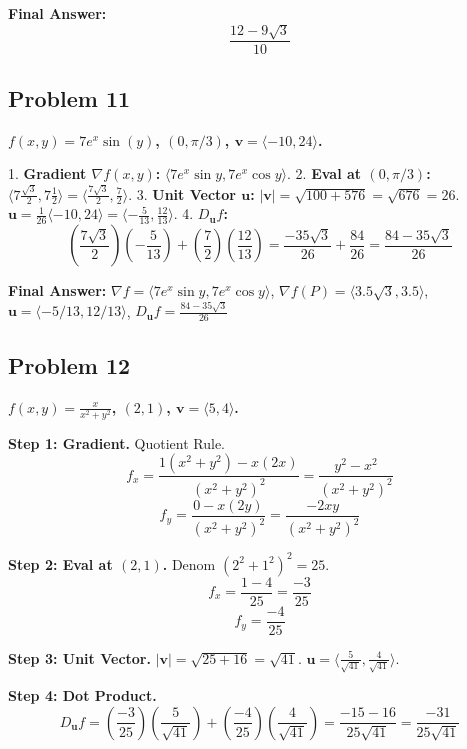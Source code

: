 \documentclass{article}
\begin{document}
\textbf{Final Answer:}
\[ \boxed{\frac{12 - 9\sqrt{3}}{10}} \]

\hrulefill

\subsection*{Problem 11}
\textbf{$f(x, y) = 7e^x \sin(y)$, $(0, \pi/3)$, $\mathbf{v} = \langle -10, 24 \rangle$.}

1. \textbf{Gradient $\nabla f(x,y)$:} $\langle 7e^x \sin y, 7e^x \cos y \rangle$.
2. \textbf{Eval at $(0, \pi/3)$:} $\langle 7\frac{\sqrt{3}}{2}, 7\frac{1}{2} \rangle = \langle \frac{7\sqrt{3}}{2}, \frac{7}{2} \rangle$.
3. \textbf{Unit Vector $\mathbf{u}$:} $|\mathbf{v}| = \sqrt{100 + 576} = \sqrt{676} = 26$.
   $\mathbf{u} = \frac{1}{26}\langle -10, 24 \rangle = \langle -\frac{5}{13}, \frac{12}{13} \rangle$.
4. \textbf{$D_{\mathbf{u}}f$:}
   \[ \left(\frac{7\sqrt{3}}{2}\right)\left(-\frac{5}{13}\right) + \left(\frac{7}{2}\right)\left(\frac{12}{13}\right) = \frac{-35\sqrt{3}}{26} + \frac{84}{26} = \frac{84 - 35\sqrt{3}}{26} \]

\textbf{Final Answer:}
$\nabla f = \langle 7e^x \sin y, 7e^x \cos y \rangle$, $\nabla f(P) = \langle 3.5\sqrt{3}, 3.5 \rangle$, $\mathbf{u} = \langle -5/13, 12/13 \rangle$, $D_{\mathbf{u}}f = \boxed{\frac{84 - 35\sqrt{3}}{26}}$

\hrulefill

\subsection*{Problem 12}
\textbf{$f(x, y) = \frac{x}{x^2+y^2}$, $(2, 1)$, $\mathbf{v} = \langle 5, 4 \rangle$.}

\textbf{Step 1: Gradient.} Quotient Rule.
\[ f_x = \frac{1(x^2+y^2) - x(2x)}{(x^2+y^2)^2} = \frac{y^2 - x^2}{(x^2+y^2)^2} \]
\[ f_y = \frac{0 - x(2y)}{(x^2+y^2)^2} = \frac{-2xy}{(x^2+y^2)^2} \]

\textbf{Step 2: Eval at $(2, 1)$.} Denom $(2^2+1^2)^2 = 25$.
\[ f_x = \frac{1 - 4}{25} = \frac{-3}{25} \]
\[ f_y = \frac{-4}{25} \]

\textbf{Step 3: Unit Vector.}
$|\mathbf{v}| = \sqrt{25+16} = \sqrt{41}$.
$\mathbf{u} = \langle \frac{5}{\sqrt{41}}, \frac{4}{\sqrt{41}} \rangle$.

\textbf{Step 4: Dot Product.}
\[ D_{\mathbf{u}}f = \left(\frac{-3}{25}\right)\left(\frac{5}{\sqrt{41}}\right) + \left(\frac{-4}{25}\right)\left(\frac{4}{\sqrt{41}}\right) = \frac{-15 - 16}{25\sqrt{41}} = \frac{-31}{25\sqrt{41}} \]
\end{document}
